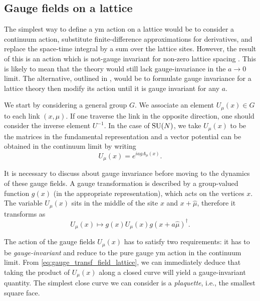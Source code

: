 %
%
\subsection{Gauge fields on a lattice}
\label{sub:gauge_fields_on_a_lattice}

The simplest way to define a \ac{ym} action on a lattice would be to consider a continuum action, substitute finite-difference approximations for derivatives, and replace the space-time integral by a sum over the lattice sites.
However, the result of this is an action which is not-gauge invariant for non-zero lattice spacing \cite{wilson1974confinement}.
This is likely to mean that the theory would still lack gauge-invariance in the $a \to 0$ limit.
The alternative, outlined in \cite{wilson1974confinement, creutz1985book}, would be to formulate gauge invariance for a lattice theory then modify its action until it is gauge invariant for any $a$.

We start by considering a general group $G$.
We associate an element $U_{\mu}(x) \in G$ to each link $(x, \mu)$.
If one traverse the link in the opposite direction, one should consider the inverse element $U^{-1}$.
In the case of $\text{SU}(N)$, we take $U_{\mu}(x)$ to be the matrices in the fundamental representation and a vector potential can be obtained in the continuum limit by writing
\begin{equation}
    U_{\mu}(x) = e^{i a g A_{\mu}(x)}.
\end{equation}


It is necessary to discuss about gauge invariance before moving to the dynamics of these gauge fields.
A gauge transformation is described by a group-valued function $g(x)$ (in the appropriate representation), which acts on the vertices $x$.
The variable $U_{\mu}(x)$ sits in the middle of the site $x$ and $x + \hat{\mu}$, therefore it transforms as
\begin{equation}
    U_{\mu}(x) \mapsto g(x) U_{\mu}(x) g(x + a \hat{\mu})^{\dagger}
    \label{eq:gauge_transf_field_lattice}.
\end{equation}

The action of the gauge fields $U_{\mu}(x)$ has to satisfy two requirements:
it has to be \emph{gauge-invariant} and reduce to the pure gauge \ac{ym} action in the continuum limit.
From \eqref{eq:gauge_transf_field_lattice}, we can immediately deduce that taking the product of $U_{\mu}(x)$ along a closed curve will yield a gauge-invariant quantity.
The simplest close curve we can consider is a \emph{plaquette}, i.e., the smallest square face.

